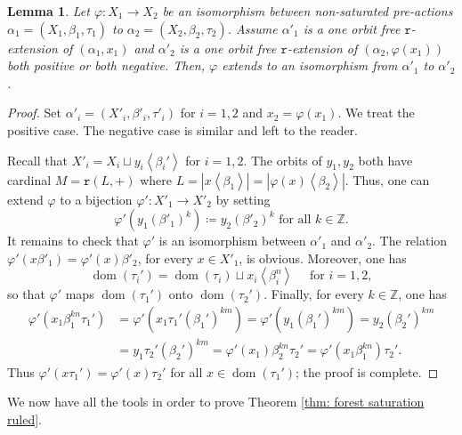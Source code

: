 \documentclass[12pt]{article}
\numberwithin{equation}{section}
\newtheorem{lemma}[equation]{Lemma}
\theoremstyle{definition}
\DeclareMathOperator{\dom}{\mathrm{dom}}
\newcommand{\Z}{\mathbb{Z}}
\newcommand{\la}{\left\langle}
\newcommand{\ra}{\right\rangle}
\newcommand{\abs}[1]{\left\lvert #1\right\rvert}
\newcommand{\trrule}{\mathtt{r}}
\begin{document}
	\begin{lemma}
		\label{lem: isomorphisms and one orbit extensions}
		Let $\varphi: X_1 \to X_2$ be an isomorphism between 
		non-saturated pre-actions $\alpha_1 = (X_1,\beta_1, \tau_1)$ to $\alpha_2 = (X_2,\beta_2, \tau_2)$.
		Assume $\alpha'_1$ is a one orbit free \( \trrule \)-extension of $(\alpha_1,x_1)$ and
		$\alpha'_2$ is a one orbit free \( \trrule \)-extension of $(\alpha_2,\varphi(x_1))$
		both positive or both negative.
		Then, $\varphi$ extends to an isomorphism from $\alpha'_1$ to $\alpha'_2$.
	\end{lemma}
	\begin{proof}
		Set $\alpha'_i = (X'_i, \beta'_i, \tau'_i)$ for $i=1,2$ and $x_2 = \varphi(x_1)$.
		We treat the positive case. The negative case is similar and left to the reader.

		Recall that $X'_i = X_i \sqcup y_i \la \beta_i' \ra$ for $i=1,2$.
		The orbits of $y_1, y_2$ both have cardinal $M=\trrule(L,+)$ where
		\(L=\abs{x\la\beta_1\ra}=\abs{\varphi(x)\la \beta_2\ra}\).
		Thus, one can extend $\varphi$ to a bijection $\varphi': X'_1 \to X'_2$ by setting
		\[\varphi'(y_1 (\beta'_1)^k)  \coloneqq y_2 (\beta'_2)^k
		\text{ for all } k\in \Z .\]
		It remains to check that $\varphi'$ is an isomorphism
		between $\alpha'_1$ and $\alpha'_2$.
		The relation $\varphi'(x\beta'_1) = \varphi'(x)\beta'_2$, for every $x\in X'_1$, is obvious.
		Moreover, one has
		\[
			\dom(\tau_i') = \dom(\tau_i) \sqcup x_i \la \beta_i^n \ra
			\quad \text{ for } i= 1,2,
		\]
		so that $\varphi'$ maps $\dom(\tau_1')$ onto $\dom(\tau_2')$.
		Finally, for every $k\in \Z$, one has
		\begin{align*}
			\varphi'(x_1 \beta_1^{kn} \tau_1')
			& = \varphi'(x_1 \tau_1' (\beta_1')^{km})
			= \varphi'(y_1 (\beta_1')^{km})
			= y_2  (\beta_2')^{km} \\
			& = y_1 \tau_2' (\beta_2')^{km}
			= \varphi'(x_1)\beta_2^{kn} \tau_2'
			= \varphi'(x_1 \beta_1^{kn}) \tau_2' .
		\end{align*}
		Thus $\varphi'(x\tau_1') = \varphi'(x) \tau_2'$ for all $x\in \dom(\tau_1')$; the proof is complete.
	\end{proof}

	We now have all the tools in order to prove Theorem \ref{thm: forest saturation ruled}.
\end{document}
